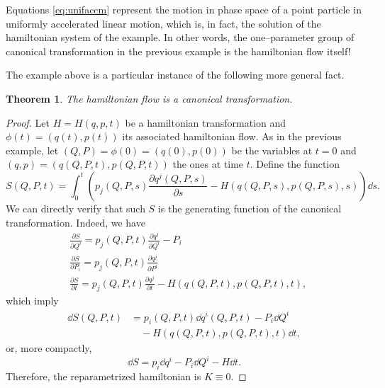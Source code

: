 \documentclass[english,fontsize=11pt,paper=b5]{scrbook}
\newtheorem{theorem}{Theorem}[chapter]
\theoremstyle{definition}
\begin{document}
    Equations \eqref{eq:unifaccm} represent the motion in phase space of a point particle in uniformly accelerated linear motion, which is, in fact, the solution of the hamiltonian system of the example.
    In other words, the one--parameter group of canonical transformation in the previous example is the hamiltonian flow itself!

    The example above is a particular instance of the following more general fact.

    \begin{theorem}
      The hamiltonian flow is a canonical transformation.
    \end{theorem}
    \begin{proof}
      Let $H = H(q,p,t)$ be a hamiltonian transformation and $\phi(t) = (q(t), p(t))$ its associated hamiltonian flow.
      As in the previous example, let $(Q, P) = \phi(0) = (q(0), p(0))$ be the variables at $t=0$ and $(q, p) = (q(Q,P,t), p(Q,P,t))$ the ones at time $t$. Define the function
      \begin{equation}
        S(Q,P,t) = \int_0^t\left(
          p_j(Q,P,s)\frac{\partial q^j(Q,P,s)}{\partial s} - H(q(Q,P,s), p(Q,P,s), s)
        \right)\dd s.
      \end{equation}
      We can directly verify that such $S$ is the generating function of the canonical transformation. Indeed, we have
      \begin{align}
     & \frac{\partial S}{\partial Q^i} = p_j(Q,P,t) \frac{\partial q^j}{\partial Q^i} - P_i                   \\
     & \frac{\partial S}{\partial P_i} = p_j(Q,P,t) \frac{\partial q^j}{\partial P^i}                         \\
     & \frac{\partial S}{\partial t} = p_j(Q,P,t) \frac{\partial q^j}{\partial t} - H(q(Q,P,t), p(Q,P,t), t),
      \end{align}
      which imply
      \begin{align}
        \dd S(Q, P, t) & = p_i(Q, P, t) \dd q^i (Q, P, t) - P_i \dd Q^i \\
                       & \quad - H(q(Q,P,t), p(Q,P,t), t) \dd t,
      \end{align}
      or, more compactly,
      \begin{equation}
        \dd S = p_i \dd q^i - P_i \dd Q^i - H \dd t.
      \end{equation}
      Therefore, the reparametrized hamiltonian is $K\equiv 0$.
    \end{proof}
\end{document}
